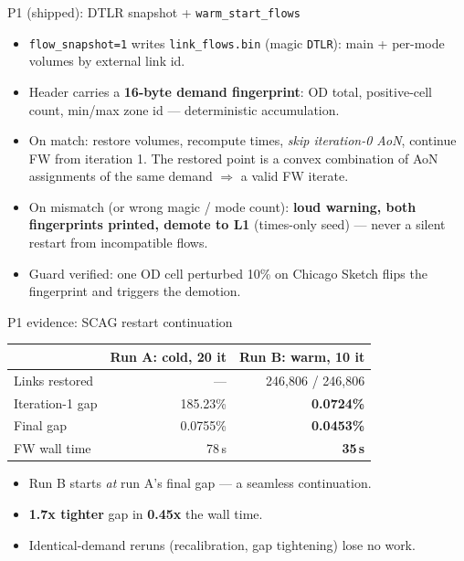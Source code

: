 \documentclass[10pt]{beamer}
\newcommand{\code}[1]{\texttt{#1}}
\begin{document}
\begin{frame}{P1 (shipped): DTLR snapshot + \code{warm\_start\_flows}}
  \begin{itemize}
    \item \code{flow\_snapshot=1} writes \code{link\_flows.bin}
      (magic \code{DTLR}): main + per-mode volumes by external link id.
    \item Header carries a \textbf{16-byte demand fingerprint}: OD total,
      positive-cell count, min/max zone id --- deterministic accumulation.
    \item On match: restore volumes, recompute times, \emph{skip iteration-0
      AoN}, continue FW from iteration 1. The restored point is a convex
      combination of AoN assignments of the same demand $\Rightarrow$ a valid
      FW iterate.
    \item On mismatch (or wrong magic / mode count): \textbf{loud warning, both
      fingerprints printed, demote to L1} (times-only seed) --- never a silent
      restart from incompatible flows.
    \item Guard verified: one OD cell perturbed 10\% on Chicago Sketch flips
      the fingerprint and triggers the demotion.
  \end{itemize}
\end{frame}

\begin{frame}{P1 evidence: SCAG restart continuation}
  \begin{table}
  \centering
  \begin{tabular}{lrr}
    \toprule
     & Run A: cold, 20 it & Run B: warm, 10 it \\
    \midrule
    Links restored    & ---       & 246{,}806 / 246{,}806 \\
    Iteration-1 gap   & 185.23\%  & \textbf{0.0724\%} \\
    Final gap         & 0.0755\%  & \textbf{0.0453\%} \\
    FW wall time      & 78\,s     & \textbf{35\,s} \\
    \bottomrule
  \end{tabular}
  \end{table}
  \begin{itemize}
    \item Run B starts \emph{at} run A's final gap --- a seamless continuation.
    \item \textbf{1.7x tighter} gap in \textbf{0.45x} the wall time.
    \item Identical-demand reruns (recalibration, gap tightening) lose no work.
  \end{itemize}
\end{frame}
\end{document}
